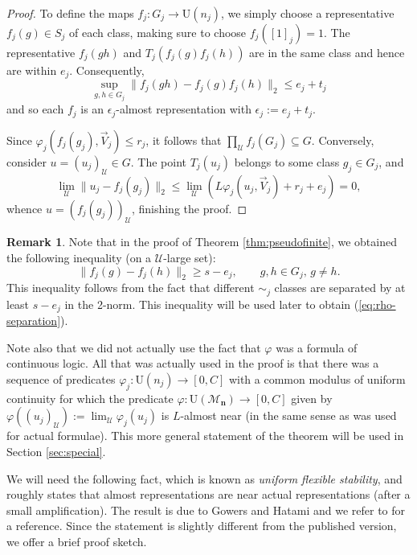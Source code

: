 \documentclass[12pt]{amsart}
\numberwithin{equation}{section}
\theoremstyle{definition}
\newtheorem{remark}[thm]{Remark}
\def\cal{\mathcal}
\def\M{\mathcal{M}}
\newcommand\cU{{\cal U}}
\def \M{\mathcal{M}}
\begin{document}
\begin{proof}
To define the maps $f_j:G_j\to \mathrm{U}(n_j)$, we simply choose a representative $f_j(g)\in S_j$ of each class, making sure to choose
$f_j([1]_j)=1$.  The representative $f_j(gh)$ and
$T_j(f_j(g)f_j(h))$ are in the same class and hence are within
$e_j$.  Consequently,
\begin{equation}\label{rec:explicit-product}
 \sup_{g,h\in G_j}\|f_j(gh)-f_j(g)f_j(h)\|_2
 \leq e_j+t_j
\end{equation}
and so each $f_j$ is an $\epsilon_j$-almost representation with $\epsilon_j:=e_j+t_j$.

Since $\varphi_j(f_j(g_j),\vec V_j)\leq r_j$, it follows that $\prod_\cU f_j(G_j)\subseteq G$.  Conversely, consider
$u=(u_j)_\cU\in G$.  The point
$T_j(u_j)$ belongs to some class $g_j\in G_j$, and
\[
 \lim_\cU\|u_j-f_j(g_j)\|_2
 \leq \lim_\cU(L\varphi_j(u_j,\vec V_j)+r_j+e_j)=0,
\]
whence $u=(f_j(g_j))_\cU$, finishing the proof.
\end{proof}

\begin{remark}\label{rem:generalpredicate}
Note that in the proof of Theorem \ref{thm:pseudofinite}, we obtained the following inequality (on a $\mathcal{U}$-large set):
\begin{equation}\|f_j(g)-f_j(h)\|_2\ge s-e_j,\qquad g,h\in G_j,\,g\neq h.\label{eq:fjestimate}
\end{equation}
This inequality follows from the fact that different $\sim_j$ classes are separated by at least $s-e_j$ in the 2-norm. This inequality will be used later to obtain (\ref{eq:rho-separation}). 

Note also that we did not actually use the fact that $\varphi$ was a formula of continuous logic.  All that was actually used in the proof is that there was a sequence of predicates $\varphi_j:\mathrm{U}(n_j)\to [0,C]$ with a common modulus of uniform continuity for which the predicate $\varphi:\mathrm{U}(\M_{\mathbf{n}})\to [0,C]$ given by $\varphi((u_j)_\cU):=\lim_\cU \varphi_j(u_j)$ is $L$-almost near (in the same sense as was used for actual formulae).  This more general statement of the theorem will be used in Section \ref{sec:special}.
\end{remark}

We will need the following fact, which is known as \emph{uniform flexible stability}, and roughly states that almost representations are near actual representations (after a small amplification).  The result is due to Gowers and Hatami and we refer to \cite[Theorem 1.6]{de2019operator} for a reference.  Since the statement is slightly different from the published version, we offer a brief proof sketch.
\end{document}

